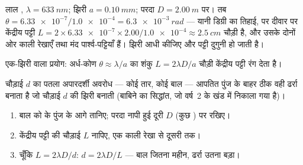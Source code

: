\begin{example}[झिरी से गुज़रता लेज़र]\label{ex:g12:light-as-wave:slit}
लाल , $\lambda = \qty{633}{nm}$; झिरी $a = \qty{0.10}{mm}$; परदा $D = \qty{2.00}{m}$ पर। तब $\theta = \num{6.33e-7} /
\num{1.0e-4} = \qty{6.3e-3}{rad}$ --- यानी
डिग्री का तिहाई, पर दीवार पर केंद्रीय पट्टी $L = 2 \times \num{6.33e-7} \times 2.00 /
\num{1.0e-4} \approx \qty{2.5}{cm}$ चौड़ी है, और उसके दोनों ओर
काली रेखाएँ तथा मंद पार्श्व-पट्टियाँ हैं। झिरी आधी कीजिए और पट्टी दुगुनी हो
जाती है।
\end{example}

\begin{omfigure}

{\small एक-झिरी वाला प्रयोग: अर्ध-कोण $\theta
\approx \lambda/a$ का शंकु $L = 2\lambda D/a$ चौड़ी
केंद्रीय पट्टी रंग देता है।}
\end{omfigure}

\begin{proposition}\label{prop:g12:light-as-wave:hair}
चौड़ाई $d$ का पतला अपारदर्शी अवरोध --- कोई तार, कोई बाल --- आपतित
पुंज के बाहर ठीक वही ढर्रा बनाता है जो चौड़ाई $d$ की झिरी बनाती (बाबिने का
सिद्धांत, जो वर्ष~2 के खंड में निकाला गया है)।
\end{proposition}
\admitted

\begin{method}[बहुत छोटी चौड़ाई नापना]\label{met:g12:light-as-wave:hairwidth}
\begin{enumerate}
  \item बाल को  के पुंज के आगे तानिए; परदा नापी हुई दूरी
        $D$ (कुछ ) पर रखिए।
  \item केंद्रीय पट्टी की चौड़ाई $L$ नापिए, एक काली रेखा से दूसरी तक।
  \item चूँकि $L = 2\lambda D/d$: $d = 2\lambda D/L$ --- बाल जितना महीन, ढर्रा उतना बड़ा।
\end{enumerate}
\end{method}

